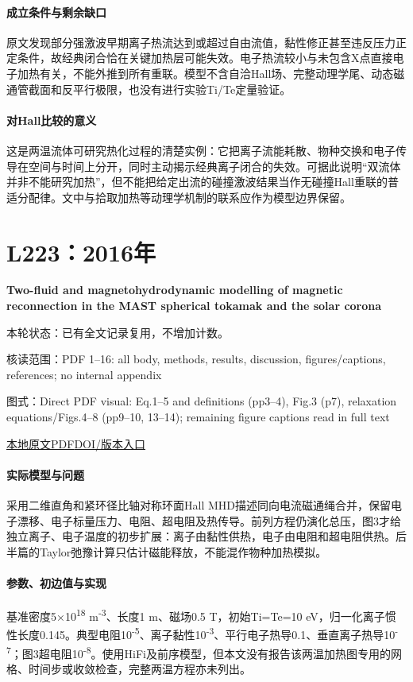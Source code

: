 \paragraph{成立条件与剩余缺口}原文发现部分强激波早期离子热流达到或超过自由流值，黏性修正甚至违反压力正定条件，故经典闭合恰在关键加热层可能失效。电子热流较小与未包含X点直接电子加热有关，不能外推到所有重联。模型不含自洽Hall场、完整动理学尾、动态磁通管截面和反平行极限，也没有进行实验Ti/Te定量验证。

\paragraph{对Hall比较的意义}这是两温流体可研究热化过程的清楚实例：它把离子流能耗散、物种交换和电子传导在空间与时间上分开，同时主动揭示经典离子闭合的失效。可据此说明“双流体并非不能研究加热”，但不能把给定出流的碰撞激波结果当作无碰撞Hall重联的普适分配律。文中与拾取加热等动理学机制的联系应作为模型边界保留。

\section{L223：2016年}\label{paper:L223}

\textbf{Two-fluid and magnetohydrodynamic modelling of magnetic reconnection in the MAST spherical tokamak and the solar corona}\citep{L223}

\textsf{本轮状态：}已有全文记录复用，不增加计数。

\textsf{核读范围：}PDF 1–16: all body,  methods,  results,  discussion,  figures/captions,  references;  no internal appendix\par\textsf{图式：}Direct PDF visual: Eq.1–5 and definitions (pp3–4),  Fig.3 (p7),  relaxation equations/Figs.4–8 (pp9–10, 13–14);  remaining figure captions read in full text

\href{run:../../papers/L223.pdf}{本地原文PDF}\quad\href{https://doi.org/10.1088/0741-3335/58/1/014041}{DOI/版本入口}

\paragraph{实际模型与问题}采用二维直角和紧环径比轴对称环面Hall MHD描述同向电流磁通绳合并，保留电子漂移、电子标量压力、电阻、超电阻及热传导。前列方程仍演化总压，图3才给独立离子、电子温度的初步扩展：离子由黏性供热，电子由电阻和超电阻供热。后半篇的Taylor弛豫计算只估计磁能释放，不能混作物种加热模拟。

\paragraph{参数、初边值与实现}基准密度5×10\textsuperscript{18} m\textsuperscript{-3}、长度1 m、磁场0.5 T，初始Ti=Te=10 eV，归一化离子惯性长度0.145。典型电阻10\textsuperscript{-5}、离子黏性10\textsuperscript{-3}、平行电子热导0.1、垂直离子热导10\textsuperscript{-7}；图3超电阻10\textsuperscript{-8}。使用HiFi及前序模型，但本文没有报告该两温加热图专用的网格、时间步或收敛检查，完整两温方程亦未列出。

